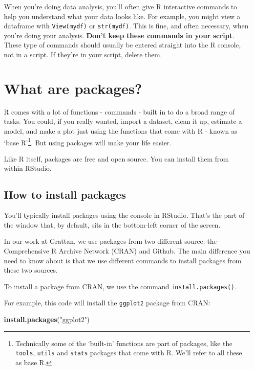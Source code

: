 \documentclass[
]{book}
\newenvironment{Shaded}{\begin{snugshade}}{\end{snugshade}}
\newcommand{\KeywordTok}[1]{\textcolor[rgb]{0.13,0.29,0.53}{\textbf{#1}}}
\newcommand{\NormalTok}[1]{#1}
\newcommand{\StringTok}[1]{\textcolor[rgb]{0.31,0.60,0.02}{#1}}
\begin{document}
When you're doing data analysis, you'll often give R interactive commands to help you understand what your data looks like. For example, you might view a dataframe with \texttt{View(mydf)} or \texttt{str(mydf)}. This is fine, and often necessary, when you're doing your analysis. \textbf{Don't keep these commands in your script}. These type of commands should usually be entered straight into the R console, not in a script. If they're in your script, delete them.

\hypertarget{packages}{%
\chapter{What are packages?}\label{packages}}

R comes with a lot of functions - commands - built in to do a broad range of tasks. You could, if you really wanted, import a dataset, clean it up, estimate a model, and make a plot just using the functions that come with R - known as `base R'\footnote{Technically some of the `built-in' functions are part of packages, like the \texttt{tools}, \texttt{utils} and \texttt{stats} packages that come with R. We'll refer to all these as base R.}. But using packages will make your life easier.

Like R itself, packages are free and open source. You can install them from within RStudio.

\hypertarget{install-packages}{%
\section{How to install packages}\label{install-packages}}

You'll typically install packages using the console in RStudio. That's the part of the window that, by default, sits in the bottom-left corner of the screen.

In our work at Grattan, we use packages from two different source: the Comprehensive R Archive Network (CRAN) and Github. The main difference you need to know about is that we use different commands to install packages from these two sources.

To install a package from CRAN, we use the command \texttt{install.packages()}.

For example, this code will install the \texttt{ggplot2} package from CRAN:

\begin{Shaded}
\begin{Highlighting}[]
\KeywordTok{install.packages}\NormalTok{(}\StringTok{"ggplot2"}\NormalTok{)}
\end{Highlighting}
\end{Shaded}
\end{document}
